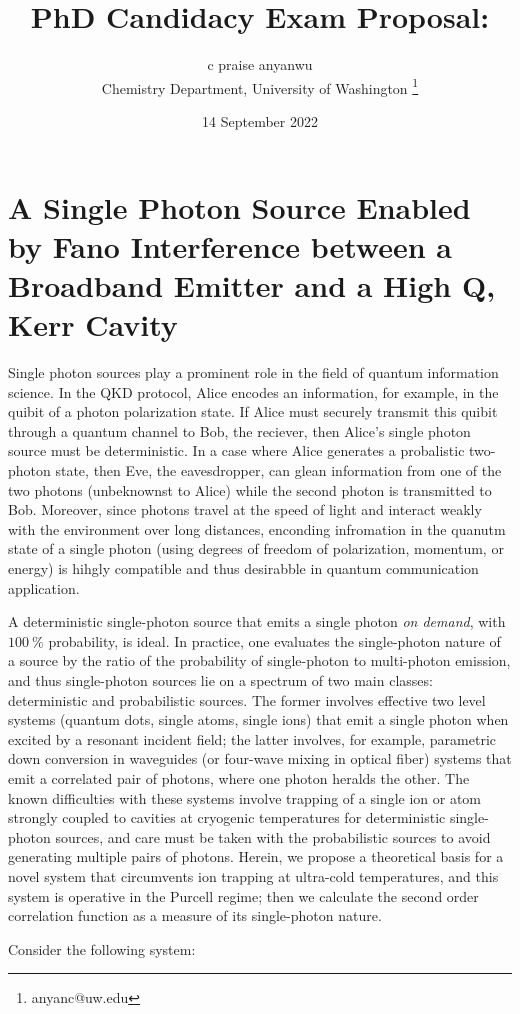 \documentclass[12pt]{article}
\begin{document}
\title{PhD Candidacy Exam Proposal:}
\author{c praise anyanwu \\
    Chemistry Department, University of Washington
    \thanks{anyanc@uw.edu} }
\date{14 September 2022}
\maketitle

\newpage

\section{A Single Photon Source Enabled by Fano Interference between a
Broadband Emitter and a High Q, Kerr Cavity}

Single photon sources play a prominent role in the field of quantum information 
science. \cite{gisin2002quantum, bennett2004quantum} In the QKD protocol, Alice encodes 
an information, for example, in the quibit of a photon polarization state. If Alice must 
securely transmit this quibit through a quantum channel to Bob, the reciever, then 
Alice's single photon source must be deterministic. In a case where Alice generates a 
probalistic two-photon state, then Eve, the eavesdropper, can glean information from one 
of the two photons (unbeknownst to Alice) while the second photon is transmitted to Bob. 
\cite{bennett1984proceedings, bennett1992quantum} Moreover, since photons travel at the 
speed of light and interact weakly with the environment over long distances, enconding 
infromation in the quanutm state of a single photon (using degrees of freedom of 
polarization, momentum, or energy) is hihgly compatible and thus desirabble in 
quantum communication application.

A deterministic single-photon source that emits a single photon \textit{on demand}, 
with $100 \: \%$ probability, is ideal. In practice, one evaluates the 
single-photon nature of a source by the ratio of the probability of single-photon 
to multi-photon emission, and thus single-photon sources lie on a spectrum of 
two main classes: deterministic and probabilistic sources. \cite{lounis2005single, 
eisaman2011invited} The former involves effective two level systems (quantum
dots, single atoms, single ions) \cite{ShieldsAndrewJ2007Sqls, strauf2007high, 
hennrich2004photon, wilk2007single, maurer2004single} that emit a single photon when 
excited by a resonant incident field; the latter involves, for example, parametric 
down conversion in waveguides (or four-wave mixing in optical fiber) systems
\cite{u2004efficient, sharping2001observation, goldschmidt2008spectrally} 
that emit a correlated pair of photons, where one photon heralds the other. 
The known difficulties with these systems involve trapping of a single ion or atom 
strongly coupled to cavities at cryogenic temperatures for deterministic single-photon 
sources, and care must be taken with the probabilistic sources to avoid generating 
multiple pairs of photons. Herein, we propose a theoretical basis for a novel system that 
circumvents ion trapping at ultra-cold temperatures, and this system is operative in the 
Purcell regime; then we calculate the second order correlation function as a measure of 
its single-photon nature.

Consider the following system:

\newpage


\end{document}
